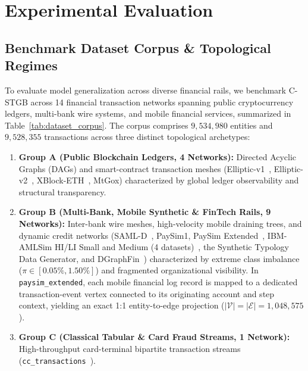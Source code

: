 \section{Experimental Evaluation}
\label{sec:experiments}

\subsection{Benchmark Dataset Corpus \& Topological Regimes}
\label{sec:dataset_corpus}
To evaluate model generalization across diverse financial rails, we benchmark C-STGB across 14 financial transaction networks spanning public cryptocurrency ledgers, multi-bank wire systems, and mobile financial services, summarized in Table~\ref{tab:dataset_corpus}. The corpus comprises $9,534,980$ entities and $9,528,355$ transactions across three distinct topological archetypes:
\begin{enumerate}[leftmargin=*]
    \item \textbf{Group A (Public Blockchain Ledgers, 4 Networks):} Directed Acyclic Graphs (DAGs) and smart-contract transaction meshes (Elliptic-v1~\cite{weber2019anti}, Elliptic-v2~\cite{bellei2024elliptic2}, XBlock-ETH~\cite{zheng2020xblock}, MtGox) characterized by global ledger observability and structural transparency.
    \item \textbf{Group B (Multi-Bank, Mobile Synthetic \& FinTech Rails, 9 Networks):} Inter-bank wire meshes, high-velocity mobile draining trees, and dynamic credit networks (SAML-D~\cite{lorenz2020samld}, PaySim1, PaySim Extended~\cite{lopez2016paysim}, IBM-AMLSim HI/LI Small and Medium (4 datasets)~\cite{suzumura2019amlsim}, the Synthetic Typology Data Generator, and DGraphFin~\cite{dgraphfin}) characterized by extreme class imbalance ($\pi \in [0.05\%, 1.50\%]$) and fragmented organizational visibility. In \texttt{paysim\_extended}, each mobile financial log record is mapped to a dedicated transaction-event vertex connected to its originating account and step context, yielding an exact 1:1 entity-to-edge projection ($|\mathcal{V}| = |\mathcal{E}| = 1,048,575$).
    \item \textbf{Group C (Classical Tabular \& Card Fraud Streams, 1 Network):} High-throughput card-terminal bipartite transaction streams (\texttt{cc\_transactions}~\cite{dalpozzolo2018credit}).
\end{enumerate}

